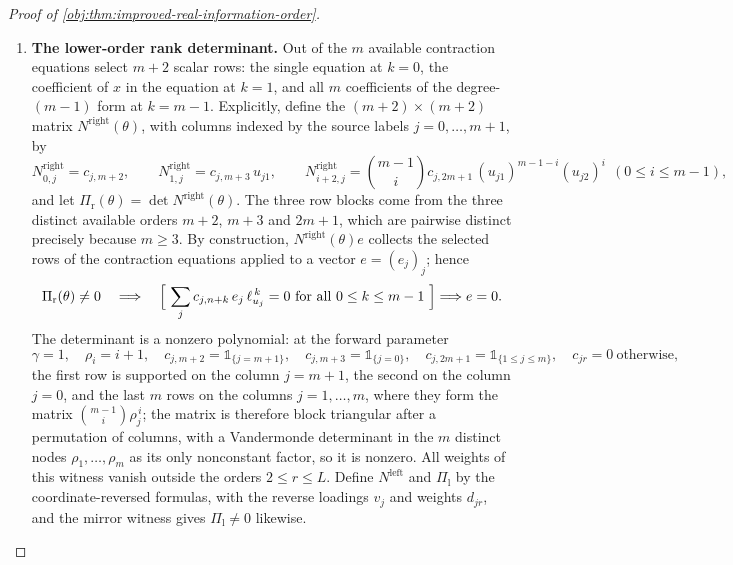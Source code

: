 \documentclass[11pt]{article}
\begin{document}
\begin{proof}[Proof of \cref{obj:thm:improved-real-information-order}]
\begin{enumerate}
\item \textbf{The lower-order rank determinant.}  Out of the \(m\) available contraction equations select \(m+2\) scalar rows: the single equation at \(k=0\), the coefficient of \(x\) in the equation at \(k=1\), and all \(m\) coefficients of the degree-\((m-1)\) form at \(k=m-1\).  Explicitly, define the \((m+2)\times(m+2)\) matrix \(N^{\mathrm{right}}(\theta)\), with columns indexed by the source labels \(j=0,\ldots,m+1\), by
\[
N^{\mathrm{right}}_{0,j}=c_{j,m+2},
\qquad
N^{\mathrm{right}}_{1,j}=c_{j,m+3}\,u_{j1},
\qquad
N^{\mathrm{right}}_{i+2,j}=\binom{m-1}{i}c_{j,2m+1}\,(u_{j1})^{m-1-i}(u_{j2})^{i}
\ \ (0\le i\le m-1),
\]
and let \(\Pi_{\mathrm r}(\theta)=\det N^{\mathrm{right}}(\theta)\).  The three row blocks come from the three distinct available orders \(m+2\), \(m+3\) and \(2m+1\), which are pairwise distinct precisely because \(m\ge3\).  By construction, \(N^{\mathrm{right}}(\theta)e\) collects the selected rows of the contraction equations applied to a vector \(e=(e_j)_j\); hence
\[
\Pi_{\mathrm r}(\theta)\ne0
\quad\Longrightarrow\quad
\Bigl[\ \sum_{j}c_{j,n+k}\,e_j\,\ell_{u_j}^{\,k}=0\ \text{for all }0\le k\le m-1\ \Bigr]\Longrightarrow e=0 .
\]
The determinant is a nonzero polynomial: at the forward parameter
\[
\gamma=1,\quad \rho_i=i+1,\quad
c_{j,m+2}=\mathbb 1_{\{j=m+1\}},\quad
c_{j,m+3}=\mathbb 1_{\{j=0\}},\quad
c_{j,2m+1}=\mathbb 1_{\{1\le j\le m\}},\quad c_{jr}=0\ \text{otherwise},
\]
the first row is supported on the column \(j=m+1\), the second on the column \(j=0\), and the last \(m\) rows on the columns \(j=1,\ldots,m\), where they form the matrix \(\binom{m-1}{i}\rho_j^{\,i}\); the matrix is therefore block triangular after a permutation of columns, with a Vandermonde determinant in the \(m\) distinct nodes \(\rho_1,\ldots,\rho_m\) as its only nonconstant factor, so it is nonzero.  All weights of this witness vanish outside the orders \(2\le r\le L\).  Define \(N^{\mathrm{left}}\) and \(\Pi_{\mathrm l}\) by the coordinate-reversed formulas, with the reverse loadings \(v_j\) and weights \(d_{jr}\), and the mirror witness gives \(\Pi_{\mathrm l}\ne0\) likewise.


\end{enumerate}
\end{proof}
\end{document}
